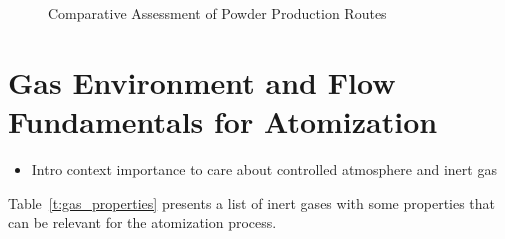 \documentclass[final,5p,times,twocolumn]{elsarticle}
\begin{document}
\begin{figure}
    \centering
        
        \caption{Comparative Assessment of Powder Production Routes}
        \label{f:production_routes}
\end{figure}

\section{Gas Environment and Flow Fundamentals for Atomization}

\begin{itemize}
  \item Intro context importance to care about controlled atmosphere and inert gas
\end{itemize}

Table~\ref{t:gas_properties} presents a list of inert gases with some properties that can be relevant for the atomization process.
\end{document}
